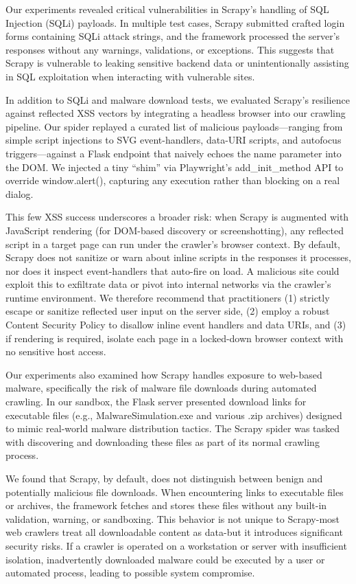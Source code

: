 Our experiments revealed critical vulnerabilities in Scrapy’s handling of SQL Injection (SQLi) payloads. In multiple test cases, Scrapy submitted crafted login forms containing SQLi attack strings, and the framework processed the server's responses without any warnings, validations, or exceptions. This suggests that Scrapy is vulnerable to leaking sensitive backend data or unintentionally assisting in SQL exploitation when interacting with vulnerable sites.

In addition to SQLi and malware download tests, we evaluated Scrapy’s resilience against reflected XSS vectors by integrating a headless browser into our crawling pipeline. Our spider replayed a curated list of malicious payloads—ranging from simple script injections to SVG event-handlers, data-URI scripts, and autofocus triggers—against a Flask endpoint that naively echoes the name parameter into the DOM. We injected a tiny “shim” via Playwright’s add_init_method API to override window.alert(), capturing any execution rather than blocking on a real dialog. 

This few XSS success underscores a broader risk: when Scrapy is augmented with JavaScript rendering (for DOM-based discovery or screenshotting), any reflected script in a target page can run under the crawler’s browser context. By default, Scrapy does not sanitize or warn about inline scripts in the responses it processes, nor does it inspect event-handlers that auto-fire on load. A malicious site could exploit this to exfiltrate data or pivot into internal networks via the crawler’s runtime environment. We therefore recommend that practitioners (1) strictly escape or sanitize reflected user input on the server side, (2) employ a robust Content Security Policy to disallow inline event handlers and data URIs, and (3) if rendering is required, isolate each page in a locked-down browser context with no sensitive host access.

Our experiments also examined how Scrapy handles exposure to web-based malware, specifically the risk of malware file downloads during automated crawling. In our sandbox, the Flask server presented download links for executable files (e.g., MalwareSimulation.exe and various .zip archives) designed to mimic real-world malware distribution tactics. The Scrapy spider was tasked with discovering and downloading these files as part of its normal crawling process.

We found that Scrapy, by default, does not distinguish between benign and potentially malicious file downloads. When encountering links to executable files or archives, the framework fetches and stores these files without any built-in validation, warning, or sandboxing. This behavior is not unique to Scrapy-most web crawlers treat all downloadable content as data-but it introduces significant security risks. If a crawler is operated on a workstation or server with insufficient isolation, inadvertently downloaded malware could be executed by a user or automated process, leading to possible system compromise.
